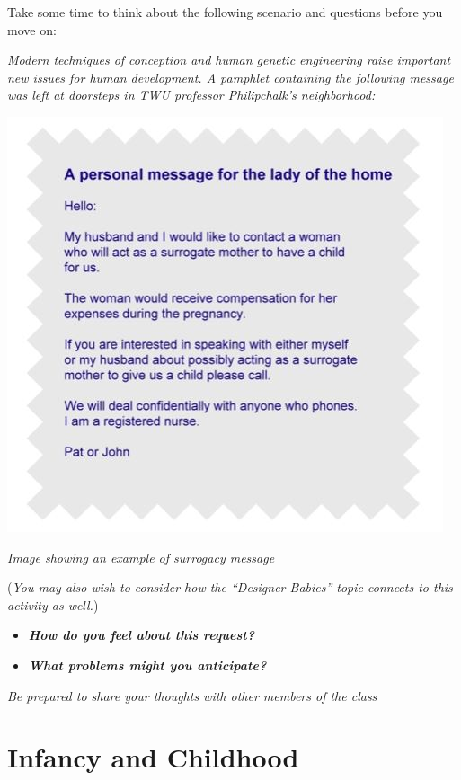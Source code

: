 \documentclass[
]{book}
\providecommand{\tightlist}{%
  \setlength{\itemsep}{0pt}\setlength{\parskip}{0pt}}
\begin{document}
\begin{reflect}
Take some time to think about the following scenario and questions before you move on:

\emph{Modern techniques of conception and human genetic engineering raise important new issues for human development. A pamphlet containing the following message was left at doorsteps in TWU professor Philipchalk's neighborhood:}

\includegraphics{assets/unit_3/U3_T1_LearningACtivitity.JPG}

\emph{Image showing an example of surrogacy message}

(\emph{You may also wish to consider how the ``Designer Babies'' topic connects to this activity as well.})

\begin{itemize}
\tightlist
\item
  \textbf{\emph{How do you feel about this request?}}
\item
  \textbf{\emph{What problems might you anticipate?}}
\end{itemize}

\emph{Be prepared to share your thoughts with other members of the class}
\end{reflect}

\hypertarget{infancy-and-childhood}{%
\section{Infancy and Childhood}\label{infancy-and-childhood}}
\end{document}
